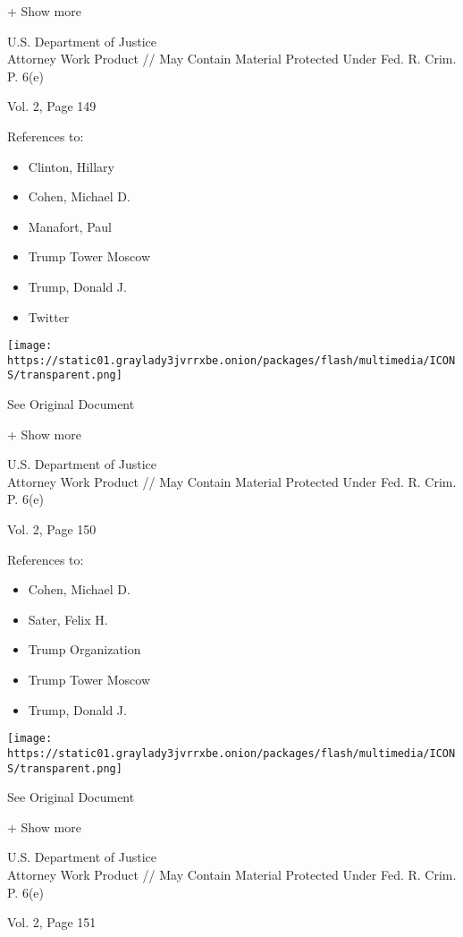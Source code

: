 + Show more

U.S. Department of Justice\\
Attorney Work Product // May Contain Material Protected Under Fed. R.
Crim. P. 6(e)

Vol. 2, Page 149

References to:

\begin{itemize}
\tightlist
\item
  Clinton, Hillary
\item
  Cohen, Michael D.
\item
  Manafort, Paul 
\item
  Trump Tower Moscow
\item
  Trump, Donald J.
\item
  Twitter
\end{itemize}

\protect\hyperlink{}{}

\texttt{[image: https://static01.graylady3jvrrxbe.onion/packages/flash/multimedia/ICONS/transparent.png]}

See Original Document

+ Show more

U.S. Department of Justice\\
Attorney Work Product // May Contain Material Protected Under Fed. R.
Crim. P. 6(e)

Vol. 2, Page 150

References to:

\begin{itemize}
\tightlist
\item
  Cohen, Michael D.
\item
  Sater, Felix H.
\item
  Trump Organization
\item
  Trump Tower Moscow
\item
  Trump, Donald J.
\end{itemize}

\protect\hyperlink{}{}

\texttt{[image: https://static01.graylady3jvrrxbe.onion/packages/flash/multimedia/ICONS/transparent.png]}

See Original Document

+ Show more

U.S. Department of Justice\\
Attorney Work Product // May Contain Material Protected Under Fed. R.
Crim. P. 6(e)

Vol. 2, Page 151

